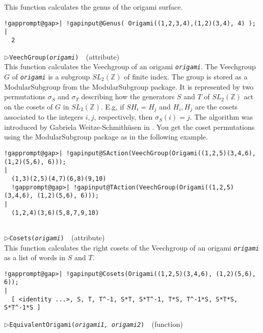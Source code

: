 \documentclass[a4paper,11pt]{report}
\begin{document}
{{{ This function calculates the genus of the origami surface. 
\begin{Verbatim}[commandchars=!@|,fontsize=\small,frame=single,label=Example]
  !gapprompt@gap>| !gapinput@Genus( Origami((1,2,3,4),(1,2)(3,4), 4) );
|
  2
\end{Verbatim}
 \noindent\textcolor{FuncColor}{$\triangleright$\enspace\texttt{VeechGroup({\mdseries\slshape origami})
\label{VeechGroup}
}\hfill{\scriptsize (attribute)}}\\


 This function calculates the Veechgroup of an origami \mbox{\texttt{\mdseries\slshape origami}}. The Veechgroup $G$ of \mbox{\texttt{\mdseries\slshape origami}} is a subgroup $SL_2(\mathbb{Z})$ of finite index. The group is stored as a ModularSubgroup from the \textsf{ModularSubgroup} package. It is represented by two permutations $\sigma_S$ and $\sigma_T$ describing how the generators $S$ and $T$ of $SL_2(\mathbb{Z})$ act on the cosets of $G$ in $SL_2(\mathbb{Z})$. E.g, if $SH_i = H_j$ and $H_i,H_j$ are the cosets associated to the integers $i,j$, respectively, then $\sigma_S(i)=j$. The algorithm was introduced by Gabriela Weitze-Schmith{\"u}sen in \cite{MR2118271}. You get the coset permutations using the \textsf{ModularSubgroup} package as in the following example. 
\begin{Verbatim}[commandchars=!@|,fontsize=\small,frame=single,label=Example]
  !gapprompt@gap>| !gapinput@SAction(VeechGroup(Origami((1,2,5)(3,4,6), (1,2)(5,6), 6)));
|
  (1,3)(2,5)(4,7)(6,8)(9,10)
  !gapprompt@gap>| !gapinput@TAction(VeechGroup(Origami((1,2,5)(3,4,6), (1,2)(5,6), 6)));
|
  (1,2,4)(3,6)(5,8,7,9,10)
          
\end{Verbatim}
 \noindent\textcolor{FuncColor}{$\triangleright$\enspace\texttt{Cosets({\mdseries\slshape origami})
\label{Cosets}
}\hfill{\scriptsize (attribute)}}\\


 This function calculates the right cosets of the Veechgroup of an origami \mbox{\texttt{\mdseries\slshape origami}} as a list of words in $S$ and $T$. 
\begin{Verbatim}[commandchars=!@|,fontsize=\small,frame=single,label=Example]
  !gapprompt@gap>| !gapinput@Cosets(Origami((1,2,5)(3,4,6), (1,2)(5,6), 6));
|
  [ <identity ...>, S, T, T^-1, S*T, S*T^-1, T*S, T^-1*S, S*T*S, S*T^-1*S ]
\end{Verbatim}
 \noindent\textcolor{FuncColor}{$\triangleright$\enspace\texttt{EquivalentOrigami({\mdseries\slshape origami1, origami2})
\label{EquivalentOrigami}
}\hfill{\scriptsize (function)}}\\


}}}
\end{document}
